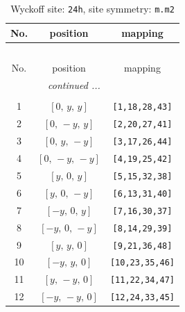 \documentclass[fleqn,8pt]{jsarticle}
\begin{document}
\begin{longtable}{ccc}
\caption{Wyckoff site: {\tt 24h}, site symmetry: {\tt m.m2}}
 \\
 \hline \hline
No. & position & mapping \\ \hline \endfirsthead

\multicolumn{2}{l}{\tablename\ \thetable{}} \\
 \hline \hline
No. & position & mapping \\ \hline \endhead

 \hline \hline
\multicolumn{2}{r}{\footnotesize\it continued ...} \\ \endfoot

 \hline \hline
\multicolumn{2}{r}{} \\ \endlastfoot

1 & $\left[ 0,\, y,\, y \right]$ & {\tt [1,18,28,43]} \\ \hline
2 & $\left[ 0,\, - y,\, y \right]$ & {\tt [2,20,27,41]} \\ \hline
3 & $\left[ 0,\, y,\, - y \right]$ & {\tt [3,17,26,44]} \\ \hline
4 & $\left[ 0,\, - y,\, - y \right]$ & {\tt [4,19,25,42]} \\ \hline
5 & $\left[ y,\, 0,\, y \right]$ & {\tt [5,15,32,38]} \\ \hline
6 & $\left[ y,\, 0,\, - y \right]$ & {\tt [6,13,31,40]} \\ \hline
7 & $\left[ - y,\, 0,\, y \right]$ & {\tt [7,16,30,37]} \\ \hline
8 & $\left[ - y,\, 0,\, - y \right]$ & {\tt [8,14,29,39]} \\ \hline
9 & $\left[ y,\, y,\, 0 \right]$ & {\tt [9,21,36,48]} \\ \hline
10 & $\left[ - y,\, y,\, 0 \right]$ & {\tt [10,23,35,46]} \\ \hline
11 & $\left[ y,\, - y,\, 0 \right]$ & {\tt [11,22,34,47]} \\ \hline
12 & $\left[ - y,\, - y,\, 0 \right]$ & {\tt [12,24,33,45]} \\
\end{longtable}
\renewcommand{\arraystretch}{1.2}
\end{document}
